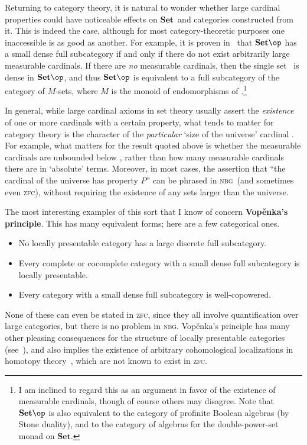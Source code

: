 \documentclass[12pt]{amsart}
\newcommand{\Set}{\ensuremath{\mathbf{Set}}}
\def\zfc{\textsc{zfc}}
\def\nbg{\textsc{nbg}}
\begin{document}
Returning to category theory, it is natural to wonder whether large
cardinal properties could have noticeable effects on \Set\ and
categories constructed from it.  This is indeed the case, although for
most category-theoretic purposes one inaccessible is as good as
another.  For example, it is proven in~\cite[A.5]{ar:loc-pres} that
$\Set\op$ has a small dense full subcategory if and only if there do
not exist arbitrarily large measurable cardinals.  If there are
\emph{no} measurable cardinals, then the single set \bbN\ is dense in
$\Set\op$, and thus $\Set\op$ is equivalent to a full subcategory of
the category of $M$-sets, where $M$ is the monoid of endomorphisms of
\bbN.\footnote{I am inclined to regard this as an argument in favor of
  the existence of measurable cardinals, though of course others may
  disagree.  Note that $\Set\op$ is also equivalent to the category of
  profinite Boolean algebras (by Stone duality), and to the category
  of algebras for the double-power-set monad on \Set.}

In general, while large cardinal axioms in set theory usually assert
the \emph{existence} of one or more cardinals with a certain property,
what tends to matter for category theory is the character of the
\emph{particular} `size of the universe' cardinal \ka.  For example,
what matters for the result quoted above is whether the measurable
cardinals are unbounded below \ka, rather than how many measurable
cardinals there are in `absolute' terms.  Moreover, in most cases, the
assertion that ``the cardinal of the universe has property $P$'' can
be phrased in \nbg\ (and sometimes even \zfc), without requiring the
existence of any sets larger than the universe.

The most interesting examples of this sort that I know of concern
\textbf{Vop\v{e}nka's principle}.  This has many equivalent forms;
here are a few categorical ones.
\begin{itemize}
\item No locally presentable category has a large discrete full
  subcategory.
\item Every complete or cocomplete category with a small dense full
  subcategory is locally presentable.
\item Every category with a small dense full subcategory is
  well-copowered.
\end{itemize}
None of these can even be stated in \zfc, since they all involve
quantification over large categories, but there is no problem in \nbg.
{Vop\v{e}nka's principle} has many other pleasing consequences for the
structure of locally presentable categories
(see~\cite[Ch.~6]{ar:loc-pres}), and also implies the existence of
arbitrary cohomological localizations in homotopy
theory~\cite{css:large-cardinal}, which are not known to exist in \zfc.
\end{document}
